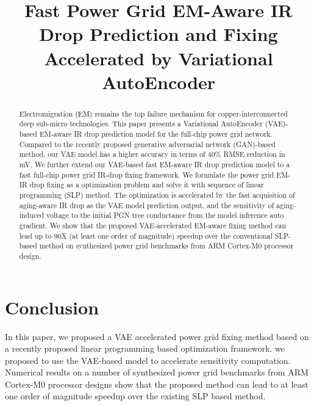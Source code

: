 \documentclass[journal]{IEEEtran}
\begin{document}
\title{ Fast Power Grid EM-Aware IR Drop Prediction and Fixing Accelerated by Variational AutoEncoder}



\maketitle
  
\begin{abstract}
Electromigration (EM) remains the top failure mechanism for copper-interconnected deep sub-micro technologies. 
This paper presents a Variational AutoEncoder (VAE)-based EM-aware IR drop prediction model for the full-chip power grid network.
Compared to the recently proposed generative adversarial network (GAN)-based method, our VAE model has a higher accuracy in terms of 40$\%$ RMSE reduction in mV.
We further extend our VAE-based fast EM-aware IR drop prediction model to a fast full-chip power grid IR-drop fixing framework.
We formulate the power grid EM-IR drop fixing as a optimization problem and solve it with sequence of linear programming (SLP) method. 
The optimization is accelerated by the fast acquisition of aging-aware IR drop as the VAE model prediction output, and the sensitivity of aging-induced voltage to the initial PGN tree conductance from the model inference auto gradient. 
We show that the proposed VAE-accelerated EM-aware fixing method can lead up to 90X (at least one order of magnitude) speedup over the conventional SLP-based method on synthesized power grid benchmarks from ARM Cortex-M0 processor design.

\end{abstract}
 








\section{Conclusion}
\label{sec:conclusion}
In this paper, we proposed a VAE accelerated power grid
fixing method based on a recently proposed linear programming based
optimization framework.  
we proposed to use the VAE-based model to accelerate sensitivity
computation.  Numerical results on a number of synthesized power grid
benchmarks from ARM Cortex-M0 processor designs show that the proposed
method can lead to at least one order of magnitude speedup over the
existing SLP based method. 
\end{document}
